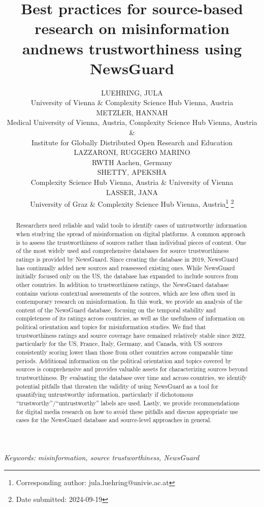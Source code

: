 \documentclass[12pt,twoside]{article}
\date{}
\title{
\normalsize \textbf{Best practices for source-based research on misinformation and\newline news trustworthiness using NewsGuard} \vspace{-3em}
}
\author{\normalsize LUEHRING, JULA \\ \normalsize University of Vienna \& Complexity Science Hub Vienna, Austria \vspace{1em} \\ \normalsize METZLER, HANNAH \\ \normalsize Medical University of Vienna, Austria, Complexity Science Hub Vienna, Austria \& \\ \normalsize Institute for Globally Distributed Open Research and Education \vspace{1em} \\ \normalsize LAZZARONI, RUGGERO MARINO \\ \normalsize RWTH Aachen, Germany \vspace{1em} \\ \normalsize SHETTY, APEKSHA \\ \normalsize Complexity Science Hub Vienna, Austria \& University of Vienna \vspace{1em} \\ \normalsize LASSER, JANA \\ \normalsize University of Graz \& Complexity Science Hub Vienna, Austria\thanks{\hspace{-1em} Corresponding author: jula.luehring@univie.ac.at} \thanks{\hspace{-1em} Date submitted: 2024-09-19}}
\providecommand{\keywords}[1]
{
   \small	
  \textit{\hspace{-1em} Keywords: } #1
}
\begin{document}
\maketitle
\thispagestyle{firstpage}
\vspace{-8em}
\begin{abstract}
\noindent 
Researchers need reliable and valid tools to identify cases of untrustworthy information when studying the spread of misinformation on digital platforms. 
A common approach is to assess the trustworthiness of sources rather than individual pieces of content. 
One of the most widely used and comprehensive databases for source trustworthiness ratings is provided by NewsGuard.
Since creating the database in 2019, NewsGuard has continually added new sources and reassessed existing ones. 
While NewsGuard initially focused only on the US, the database has expanded to include sources from other countries. 
In addition to trustworthiness ratings, the NewsGuard database contains various contextual assessments of the sources, which are less often used in contemporary research on misinformation.
In this work, we provide an analysis of the content of the NewsGuard database, focusing on the temporal stability and completeness of its ratings across countries, as well as the usefulness of information on political orientation and topics for misinformation studies.  
We find that trustworthiness ratings and source coverage have remained relatively stable since 2022, particularly for the US, France, Italy, Germany, and Canada, with US sources consistently scoring lower than those from other countries across comparable time periods.
Additional information on the political orientation and topics covered by sources is comprehensive and provides valuable assets for characterizing sources beyond trustworthiness.
By evaluating the database over time and across countries, we identify potential pitfalls that threaten the validity of using NewsGuard as a tool for quantifying untrustworthy information, particularly if dichotomous ``trustworthy''/``untrustworthy'' labels are used.
Lastly, we provide recommendations for digital media research on how to avoid these pitfalls and discuss appropriate use cases for the NewsGuard database and source-level approaches in general.
\end{abstract}
\keywords{\textit{misinformation, source trustworthiness, NewsGuard} \vspace{8ex}}
\end{document}
